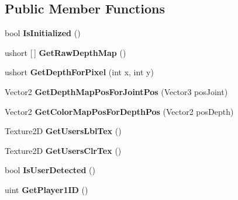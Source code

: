 \subsection*{Public Member Functions}
\begin{DoxyCompactItemize}
\item 
\mbox{\label{class_kinect_manager_aa07e9cb88230c121afccf01a22716673}} 
bool {\bfseries Is\+Initialized} ()
\item 
\mbox{\label{class_kinect_manager_ab05138e9b95ebb46853c2c268c6f8f93}} 
ushort \mbox{[}$\,$\mbox{]} {\bfseries Get\+Raw\+Depth\+Map} ()
\item 
\mbox{\label{class_kinect_manager_a4d82afa0b4034d9138038ed8c073ebc1}} 
ushort {\bfseries Get\+Depth\+For\+Pixel} (int x, int y)
\item 
\mbox{\label{class_kinect_manager_aabf3116ff588a1b7ff564f54c9d93964}} 
Vector2 {\bfseries Get\+Depth\+Map\+Pos\+For\+Joint\+Pos} (Vector3 pos\+Joint)
\item 
\mbox{\label{class_kinect_manager_a66c9e59129890772e71357820026470f}} 
Vector2 {\bfseries Get\+Color\+Map\+Pos\+For\+Depth\+Pos} (Vector2 pos\+Depth)
\item 
\mbox{\label{class_kinect_manager_a496b20df4657e69c701e5822b12ef763}} 
Texture2D {\bfseries Get\+Users\+Lbl\+Tex} ()
\item 
\mbox{\label{class_kinect_manager_a8b96d9349b9c0a3533057c36b6cd85d2}} 
Texture2D {\bfseries Get\+Users\+Clr\+Tex} ()
\item 
\mbox{\label{class_kinect_manager_a552c99f810205b173741f9898edb62bf}} 
bool {\bfseries Is\+User\+Detected} ()
\item 
\mbox{\label{class_kinect_manager_a2aa6087c65ebd098da4e0b09c4ab915e}} 
uint {\bfseries Get\+Player1\+ID} ()
\item 
\mbox{\label{class_kinect_manager_ac64453e53112fb39afe7b50c16c6f3ce}} 

\end{DoxyCompactItemize}
